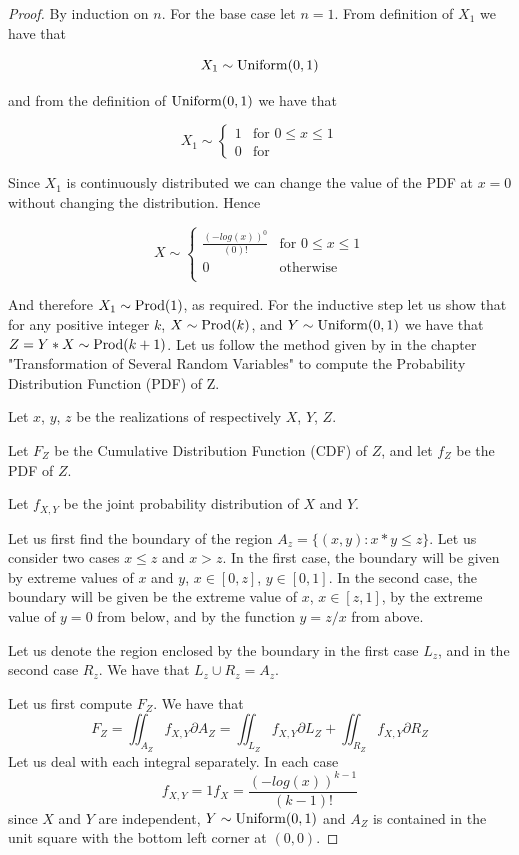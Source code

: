 \begin{proof}
By induction on $n$. For the base case let $n = 1$. From definition of $X_{1}$ we have that

$$ X_{1} \sim \operatorname{Uniform}(0, 1) $$

and from the definition of $\operatorname{Uniform}(0, 1)$ we have that

$$
X_{1} \sim \begin{cases}
  1 & \text{for } 0 \leq x \leq 1 \\
  0 & \text{for}
\end{cases}
$$

Since $X_{1}$ is continuously distributed we can change the value of the PDF at $x=0$ without changing the distribution. Hence

$$
X \sim
\begin{cases}
  \frac{(-log(x))^{0}}{(0)!} & \text{for } 0 \leq x \leq 1 \\
  0 & \text{otherwise } \\
\end{cases}
$$

And therefore $X_{1} \sim \operatorname{Prod}(1)$, as required. For the inductive step let us show that for any positive integer $k$, $X \sim \operatorname{Prod}(k)$, and $Y \sim \operatorname{Uniform}(0, 1)$ we have that $Z = Y * X \sim \operatorname{Prod}(k+1)$. Let us follow the method given by \cite{Wasserman2004} in the chapter "Transformation of Several Random Variables" to compute the Probability Distribution Function (PDF) of Z.

Let $x$, $y$, $z$ be the realizations of respectively $X$, $Y$, $Z$.

Let $F_{Z}$ be the Cumulative Distribution Function (CDF) of $Z$, and let $f_{Z}$ be the PDF of $Z$.

Let $f_{X,Y}$ be the joint probability distribution of $X$ and $Y$.

Let us first find the boundary of the region $A_{z} = \{(x, y): x * y \leq z\}$. Let us consider two cases $x \leq z$ and $x > z$. In the first case, the boundary will be given by extreme values of $x$ and $y$, $x \in [0, z]$, $y \in [0, 1]$. In the second case, the boundary will be given be the extreme value of $x$, $x \in [z, 1]$, by the extreme value of $y = 0$ from below, and by the function $y = z/x$ from above.

Let us denote the region enclosed by the boundary in the first case $L_{z}$, and in the second case $R_{z}$. We have that $L_{z} \cup R_{z} = A_{z}$.

Let us first compute $F_{Z}$. We have that
$$F_{Z} = \iint_{A_{Z}}f_{X,Y}\partial A_{Z}=\iint_{L_{Z}}f_{X, Y}\partial L_{Z} + \iint_{R_{Z}}f_{X, Y}\partial R_{Z}$$
Let us deal with each integral separately. In each case
$$f_{X, Y}=1f_{X}=\frac{(-log(x))^{k-1}}{(k-1)!}$$ since $X$ and $Y$ are independent, $Y \sim \operatorname{Uniform}(0, 1)$ and $A_{Z}$ is contained in the unit square with the bottom left corner at $(0, 0)$.


\end{proof}
